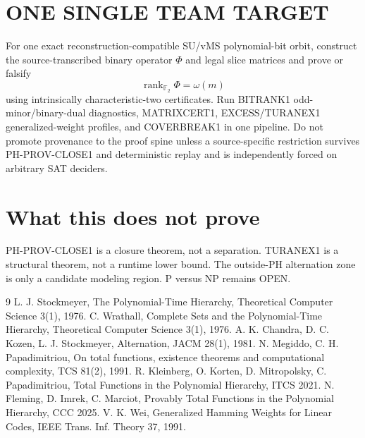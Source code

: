 \documentclass[11pt]{article}
\begin{document}
\section*{ONE SINGLE TEAM TARGET}
For one exact reconstruction-compatible SU/vMS polynomial-bit orbit, construct the source-transcribed
binary operator \(\Phi\) and legal slice matrices and prove or falsify
\[
\boxed{\operatorname{rank}_{\mathbb F_2}\Phi=\omega(m)}
\]
using intrinsically characteristic-two certificates. Run BITRANK1 odd-minor/binary-dual diagnostics,
MATRIXCERT1, EXCESS/TURANEX1 generalized-weight profiles, and COVERBREAK1 in one pipeline.
Do not promote provenance to the proof spine unless a source-specific restriction survives
PH-PROV-CLOSE1 and deterministic replay and is independently forced on arbitrary SAT deciders.

\section*{What this does not prove}
PH-PROV-CLOSE1 is a closure theorem, not a separation. TURANEX1 is a structural theorem, not a
runtime lower bound. The outside-PH alternation zone is only a candidate modeling region. P versus NP
remains OPEN.

\begin{thebibliography}{9}
 L. J. Stockmeyer, The Polynomial-Time Hierarchy, Theoretical Computer Science 3(1), 1976.
 C. Wrathall, Complete Sets and the Polynomial-Time Hierarchy, Theoretical Computer Science 3(1), 1976.
 A. K. Chandra, D. C. Kozen, L. J. Stockmeyer, Alternation, JACM 28(1), 1981.
 N. Megiddo, C. H. Papadimitriou, On total functions, existence theorems and computational complexity, TCS 81(2), 1991.
 R. Kleinberg, O. Korten, D. Mitropolsky, C. Papadimitriou, Total Functions in the Polynomial Hierarchy, ITCS 2021.
 N. Fleming, D. Imrek, C. Marciot, Provably Total Functions in the Polynomial Hierarchy, CCC 2025.
 V. K. Wei, Generalized Hamming Weights for Linear Codes, IEEE Trans. Inf. Theory 37, 1991.
\end{thebibliography}
\end{document}

